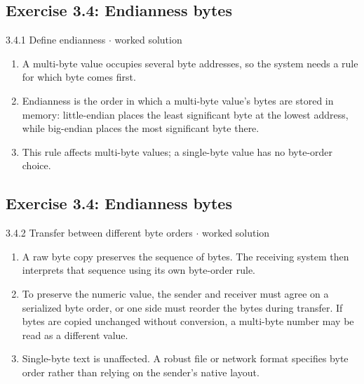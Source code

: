 \documentclass[11pt]{article}
\begin{document}
\begin{keepsection}\subsection{Exercise 3.4: Endianness bytes}

\begin{workedbox}{3.4.1 Define endianness \ensuremath{\cdot} worked solution}
\begin{enumerate}
\item A multi-byte value occupies several byte addresses, so the system needs a rule for which byte comes first.
\item Endianness is the order in which a multi-byte value’s bytes are stored in memory: little-endian places the least significant byte at the lowest address, while big-endian places the most significant byte there.
\item This rule affects multi-byte values; a single-byte value has no byte-order choice.
\end{enumerate}
\end{workedbox}

\end{keepsection}
\begin{keepsection}\subsection{Exercise 3.4: Endianness bytes}

\begin{workedbox}{3.4.2 Transfer between different byte orders \ensuremath{\cdot} worked solution}
\begin{enumerate}
\item A raw byte copy preserves the sequence of bytes. The receiving system then interprets that sequence using its own byte-order rule.
\item To preserve the numeric value, the sender and receiver must agree on a serialized byte order, or one side must reorder the bytes during transfer. If bytes are copied unchanged without conversion, a multi-byte number may be read as a different value.
\item Single-byte text is unaffected. A robust file or network format specifies byte order rather than relying on the sender’s native layout.
\end{enumerate}
\end{workedbox}

\end{keepsection}
\end{document}
